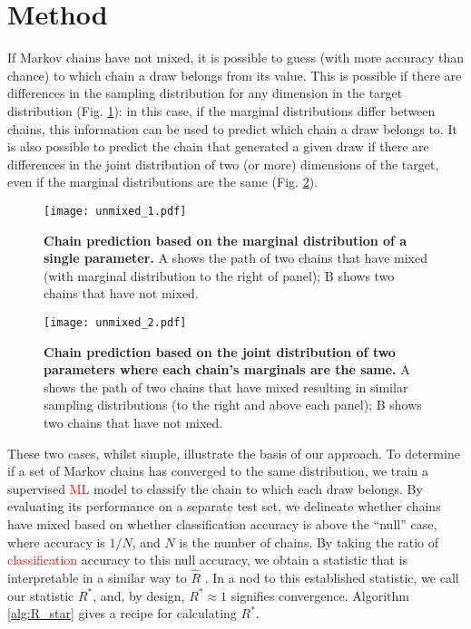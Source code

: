 \documentclass{article}
\begin{document}
\section{Method}\label{sec:method}
If Markov chains have not mixed, it is possible to guess (with more accuracy than chance) to which chain a draw belongs from its value. This is possible if there are differences in the sampling distribution for any dimension in the target distribution (Fig. \ref{fig:marginal}): in this case, if the marginal distributions differ between chains, this information can be used to predict which chain a draw belongs to. It  is also possible to predict the chain that generated a given draw if there are differences in the joint distribution of two (or more) dimensions of the target, even if the marginal distributions are the same (Fig. \ref{fig:joint}).

\begin{figure}[!htb]
	\centerline{\texttt{[image: unmixed\_1.pdf]}}
	\caption{\textbf{Chain prediction based on the marginal distribution of a single parameter.} A shows the path of two chains that have mixed (with marginal distribution to the right of panel); B shows two chains that have not mixed.}
	\label{fig:marginal}
\end{figure}

\begin{figure}[h]
	\centerline{\texttt{[image: unmixed\_2.pdf]}}
	\caption{\textbf{Chain prediction based on the joint distribution of two parameters where each chain's marginals are the same.} A shows the path of two chains that have mixed resulting in similar sampling distributions (to the right and above each panel); B shows two chains that have not mixed.}
	\label{fig:joint}
\end{figure}

These two cases, whilst simple, illustrate the basis of our approach. To determine if a set of Markov chains has converged to the same distribution, we train a supervised \textcolor{red}{ML} model to classify the chain to which each draw belongs. By evaluating its performance on a separate test set, we delineate whether chains have mixed based on whether classification accuracy is above the ``null'' case, where accuracy is $1/{N}$, and $N$ is the number of chains. By taking the ratio of \textcolor{red}{classification} accuracy to this null accuracy, we obtain a statistic that is interpretable in a similar way to $\widehat{R}$ \citep{vehtari2019rank}. In a nod to this established statistic, we call our statistic $R^*$, and, by design, $R^*\approx 1$ signifies convergence. Algorithm \ref{alg:R_star} gives a recipe for calculating $R^*$.
\end{document}
